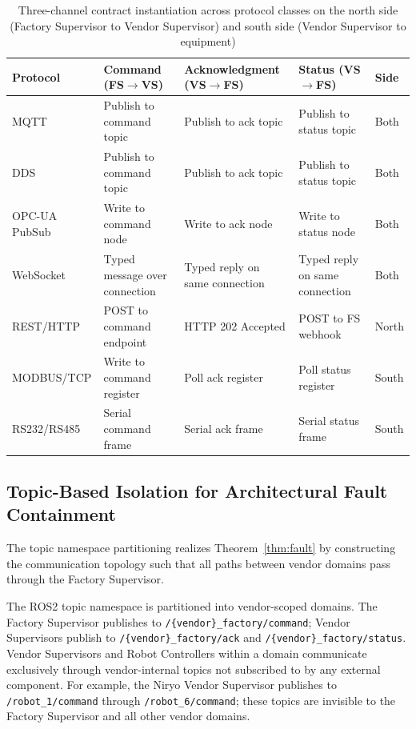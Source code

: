 \documentclass[a4paper,fleqn]{cas-dc}
\begin{document}
\begin{table}[h]
\centering
\small
\caption{Three-channel contract instantiation across protocol classes on the north side (Factory Supervisor to Vendor Supervisor) and south side (Vendor Supervisor to equipment)}
\label{tab:protocol_mapping}
\begin{tabular}{p{2.2cm}p{2.8cm}p{2.8cm}p{2.8cm}p{1.4cm}}
\toprule
\textbf{Protocol} & \textbf{Command (FS$\to$VS)} & \textbf{Acknowledgment (VS$\to$FS)} & \textbf{Status (VS$\to$FS)} & \textbf{Side} \\
\midrule
MQTT            & Publish to command topic      & Publish to ack topic               & Publish to status topic       & Both \\
DDS             & Publish to command topic      & Publish to ack topic               & Publish to status topic       & Both \\
OPC-UA PubSub   & Write to command node         & Write to ack node                  & Write to status node          & Both \\
WebSocket       & Typed message over connection & Typed reply on same connection     & Typed reply on same connection & Both \\
REST/HTTP       & POST to command endpoint      & HTTP 202 Accepted                  & POST to FS webhook            & North \\
MODBUS/TCP      & Write to command register     & Poll ack register                  & Poll status register          & South \\
RS232/RS485     & Serial command frame          & Serial ack frame                   & Serial status frame           & South \\
\bottomrule
\end{tabular}
\end{table}

\subsection{Topic-Based Isolation for Architectural Fault Containment}

The topic namespace partitioning realizes Theorem~\ref{thm:fault} by constructing the communication topology such that all paths between vendor domains pass through the Factory Supervisor.

The ROS2 topic namespace is partitioned into vendor-scoped domains. The Factory Supervisor publishes to \texttt{/\{vendor\}\_factory/command}; Vendor Supervisors publish to \texttt{/\{vendor\}\_factory/ack} and \texttt{/\{vendor\}\_factory/status}. Vendor Supervisors and Robot Controllers within a domain communicate exclusively through vendor-internal topics not subscribed to by any external component. For example, the Niryo Vendor Supervisor publishes to \texttt{/robot\_1/command} through \texttt{/robot\_6/command}; these topics are invisible to the Factory Supervisor and all other vendor domains.
\end{document}
